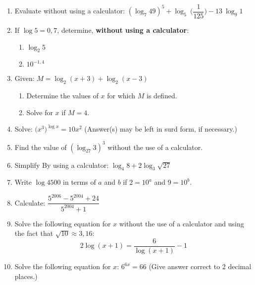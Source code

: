 \begin{enumerate}
\item{Evaluate without using a calculator: $(\log_{ 7} 49)^5 + \log_{ 5} \: \biggl(\dfrac{1}{125}\biggr) - 13\:\log_{ 9} 1$}

\item{If $\log 5 = 0,7$, determine, \textbf{without using a calculator}:
\begin{enumerate}
\item{$\log_2 5$}
\item{$10^{-1,4}$}
\end{enumerate}}

\item{Given: \qquad $M = \log_2 (x+3) + \log_2 (x-3)$
\begin{enumerate}
\item{Determine the values of $x$ for which $M$ is defined.}
\item{Solve for $x$ if $M = 4$.}
\end{enumerate}}

\item{Solve: \qquad $\biggl(x^3\biggr)^{\log x} = 10 x^2$ (Answer(s) may be left in surd form, if necessary.)}

\item{Find the value of $(\log_{27} 3)^3$ without the use of a calculator.}

\item{Simplify By using a calculator:  $\log_4 8 + 2 \log_3 \sqrt{27}$}

\item{Write $\log 4500$ in terms of $a$ and $b$ if $2=10^a$ and $9=10^b$.}

\item{Calculate: \qquad $\dfrac{5^{2006} - 5^{2004} + 24}{5^{2004} + 1}$}

\item{Solve the following equation for $x$ without the use of a calculator and using the fact that $\sqrt{10} \approx 3,16:$ $$2\log(x+1) = \dfrac{6}{\log(x+1)}-1$$}

\item{Solve the following equation for $x$: $6^{6x} = 66$ \quad (Give answer correct to 2 decimal places.)}

\end{enumerate}







